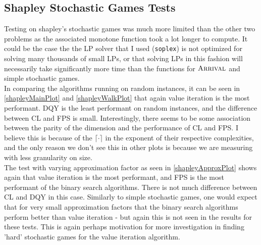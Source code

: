 \subsection{Shapley Stochastic Games Tests}
Testing on shapley's stochastic games was much more limited than the other two problems
as the associated monotone function took a lot longer to compute. It could be the case
the the LP solver that I used (\lstinline{soplex}) is not optimized for solving
many thousands of small LPs, or that solving LPs in this fashion will necessarily
take significantly more time than the functions for $\textsc{Arrival}$ and simple stochastic games. \\
In comparing the algorithms running on random instances, it can be seen in \cref{shapleyMainPlot}
and \cref{shapleyWalkPlot} that 
again value iteration is the most performant. DQY is the least performant on random instances, and the difference
between CL and FPS is small. Interestingly, there seems to be some association between
the parity of the dimension and the performance of CL and FPS. I believe this is because of the 
$\lceil \cdot \rceil$ in the exponent of their respective complexities, and the only reason
we don't see this in other plots is because we are measuring with less granularity on size. \\
The test with varying approximation factor as seen in \cref{shapleyApproxPlot} shows
again that value iteration is the most performant, and FPS is the most performant of the binary search algorithms.
There is not much difference between CL and DQY in this case. Similarly to simple stochastic games,
one would expect that for very small approximation factors that the binary search algorithms
perform better than value iteration - but again this is not seen in the results for these tests. This is again
perhaps motivation for more investigation in finding 'hard' stochastic games for the value iteration algorithm.

